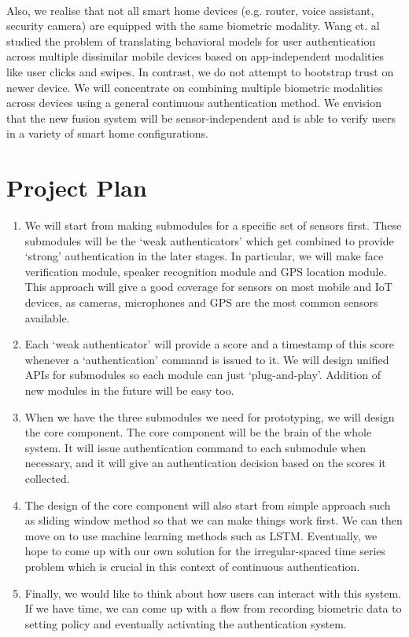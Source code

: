 \documentclass[a4paper, 11pt]{article}
\begin{document}
\noindent\\
Also, we realise that not all smart home devices (e.g. router, voice assistant, security camera) are equipped with the same biometric modality. Wang et. al ~\cite{wang2017towards} studied the problem of translating behavioral models for user authentication across multiple dissimilar mobile devices based on app-independent modalities like user clicks and swipes. In contrast, we do not attempt to bootstrap trust on newer device. We will concentrate on combining multiple biometric modalities across devices using a general continuous authentication method. We envision that the new fusion system will be sensor-independent and is able to verify users in a variety of smart home configurations.

\section*{Project Plan}
\begin{enumerate}
\item We will start from making submodules for a specific set of sensors first. These submodules will be the ‘weak authenticators’ which get combined to provide ‘strong’ authentication in the later stages. In particular, we will make face verification module, speaker recognition module and GPS location module. This approach will give a good coverage for sensors on most mobile and IoT devices, as cameras, microphones and GPS are the most common sensors available.  
\item Each ‘weak authenticator’ will provide a score and a timestamp of this score whenever a ‘authentication’ command is issued to it. We will design unified APIs for submodules so each module can just ‘plug-and-play’. Addition of new modules in the future will be easy too.
\item When we have the three submodules we need for prototyping, we will design the core component. The core component will be the brain of the whole system. It will issue authentication command to each submodule when necessary, and it will give an authentication decision based on the scores it collected.
\item The design of the core component will also start from simple approach such as sliding window method so that we can make things work first. We can then move on to use machine learning methods such as LSTM. Eventually, we hope to come up with our own solution for the irregular-spaced time series problem which is crucial in this context of continuous authentication.
\item Finally, we would like to think about how users can interact with this system. If we have time, we can come up with a flow from recording biometric data to setting policy and eventually activating the authentication system.
\end{enumerate}
\end{document}
